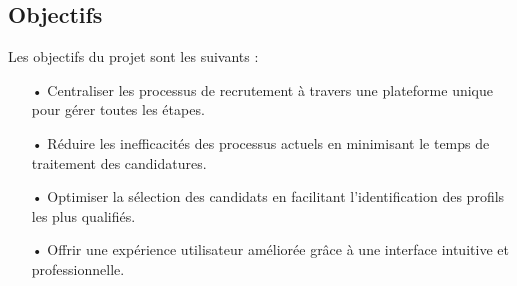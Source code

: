 \subsection{Objectifs}




Les objectifs du projet sont les suivants :
\begin{itemize}
    \item[•] Centraliser les processus de recrutement à travers une plateforme unique pour gérer toutes les étapes.
    \item[•] Réduire les inefficacités des processus actuels en minimisant le temps de traitement des candidatures.
    \item[•] Optimiser la sélection des candidats en facilitant l'identification des profils les plus qualifiés.
    \item[•] Offrir une expérience utilisateur améliorée grâce à une interface intuitive et professionnelle.
\end{itemize}

